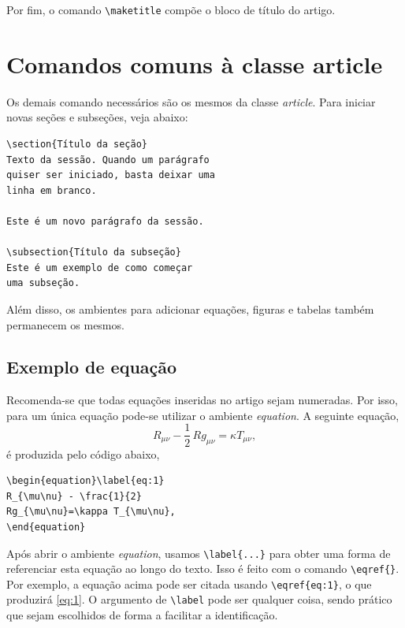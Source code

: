 \documentclass{cda}
\begin{document}
Por fim, o comando \verb|\maketitle| compõe o bloco de título do artigo.


\section{Comandos comuns à classe article}
Os demais comando necessários são os mesmos da classe \textit{article}. Para iniciar novas seções e subseções, veja abaixo:

\begin{verbatim}
\section{Título da seção}
Texto da sessão. Quando um parágrafo
quiser ser iniciado, basta deixar uma
linha em branco.

Este é um novo parágrafo da sessão.

\subsection{Título da subseção}
Este é um exemplo de como começar
uma subseção.
\end{verbatim}

Além disso, os ambientes para adicionar equações, figuras e tabelas também permanecem os mesmos.

\subsection{Exemplo de equação}
Recomenda-se que todas equações inseridas no artigo sejam numeradas. Por isso, para um única equação pode-se utilizar o ambiente \textit{equation}. A seguinte equação,
\begin{equation}\label{eq:1}
 R_{\mu\nu} - \frac{1}{2}\,Rg_{\mu\nu}=\kappa T_{\mu\nu},
\end{equation}
é produzida pelo código abaixo,
\begin{verbatim}
\begin{equation}\label{eq:1}
R_{\mu\nu} - \frac{1}{2}
Rg_{\mu\nu}=\kappa T_{\mu\nu},
\end{equation}
\end{verbatim}
Após abrir o ambiente \textit{equation}, usamos \verb|\label{...}| para obter uma forma de referenciar esta equação ao longo do texto. Isso é feito com o comando \verb|\eqref{}|. Por exemplo, a equação acima pode ser citada usando \verb|\eqref{eq:1}|, o que produzirá \eqref{eq:1}. O argumento de \verb|\label| pode ser qualquer coisa, sendo prático que sejam escolhidos de forma a facilitar a identificação.
\end{document}
